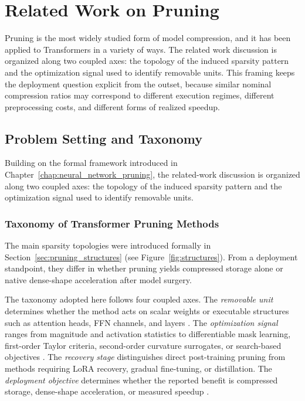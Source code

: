 ﻿\section{Related Work on Pruning}
Pruning is the most widely studied form of model compression, and it has been applied to Transformers in a variety of ways. The related work discussion is organized along two coupled axes: the topology of the induced sparsity pattern and the optimization signal used to identify removable units. This framing keeps the deployment question explicit from the outset, because similar nominal compression ratios may correspond to different execution regimes, different preprocessing costs, and different forms of realized speedup.

\subsection{Problem Setting and Taxonomy}

\providecommand{\methoddetail}[1]{%
    \par\medskip
    \noindent{\bfseries #1}\par
    \smallskip\noindent
}
\providecommand{\methodsep}{%
    \par\smallskip
    \noindent\rule{0.28\textwidth}{0.35pt}
    \par\smallskip
}

Building on the formal framework introduced in Chapter~\ref{chap:neural_network_pruning}, the related-work discussion is organized along two coupled axes: the topology of the induced sparsity pattern and the optimization signal used to identify removable units.

\subsubsection{Taxonomy of Transformer Pruning Methods}

The main sparsity topologies were introduced formally in Section~\ref{sec:pruning_structures} (see Figure~\ref{fig:structures}). From a deployment standpoint, they differ in whether pruning yields compressed storage alone or native dense-shape acceleration after model surgery.

The taxonomy adopted here follows four coupled axes. The \emph{removable unit} determines whether the method acts on scalar weights or executable structures such as attention heads, FFN channels, and layers \cite{michel2022not,kurtic2022optimal}. The \emph{optimization signal} ranges from magnitude and activation statistics to differentiable mask learning, first-order Taylor criteria, second-order curvature surrogates, or search-based objectives \cite{sun2023simple,xia2022structured,ma2023llmpruner,frantar2023sparsegpt,kwon2022fast}. The \emph{recovery stage} distinguishes direct post-training pruning from methods requiring LoRA recovery, gradual fine-tuning, or distillation. The \emph{deployment objective} determines whether the reported benefit is compressed storage, dense-shape acceleration, or measured speedup \cite{kurtic2023ziplm,evopress2024,darwinlm2025}.

